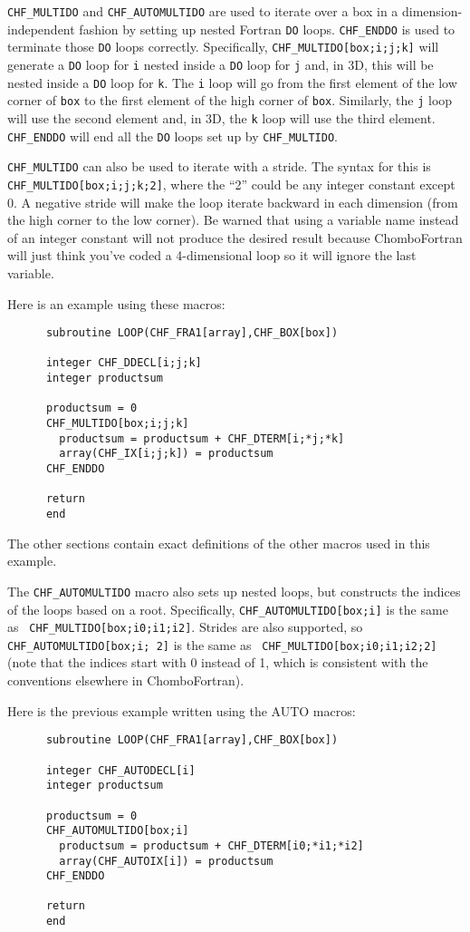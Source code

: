 {\tt CHF\_MULTIDO} and {\tt CHF\_AUTOMULTIDO} are used to iterate over
a box in a dimension-independent  
fashion by setting up nested Fortran {\tt DO} loops. {\tt CHF\_ENDDO}
is used to 
terminate those {\tt DO} loops correctly.  Specifically,
{\tt CHF\_MULTIDO[box;i;j;k]} will generate a {\tt DO} loop for {\tt i}
nested inside a {\tt DO} loop for {\tt j} and, in 3D, this will be nested inside
a {\tt DO} loop for {\tt k}.  The {\tt i} loop will go from the first element of the
low corner of {\tt box} to the first element of the high corner of {\tt box}.
Similarly, the {\tt j} loop will use the second element and, in 3D, the
{\tt k} loop will use the third element.  {\tt CHF\_ENDDO} will end all the
{\tt DO} loops set up by {\tt CHF\_MULTIDO}.

{\tt CHF\_MULTIDO} can also be used to iterate with a stride.  The syntax
for this is {\tt CHF\_MULTIDO[box;i;j;k;2]}, where the ``2'' could be any
integer constant except 0.  A negative stride will make the loop iterate
backward in each dimension (from the high corner to the low corner).
Be warned that using a variable name instead of an integer constant will 
not produce the desired result because ChomboFortran will just think you've
coded a 4-dimensional loop so it will ignore the last variable.

Here is an example using these macros:
\begin{verbatim}
      subroutine LOOP(CHF_FRA1[array],CHF_BOX[box])

      integer CHF_DDECL[i;j;k]
      integer productsum

      productsum = 0
      CHF_MULTIDO[box;i;j;k]
        productsum = productsum + CHF_DTERM[i;*j;*k]
        array(CHF_IX[i;j;k]) = productsum
      CHF_ENDDO

      return
      end
\end{verbatim}
The other sections contain exact definitions of the other macros used in
this example.

The {\tt CHF\_AUTOMULTIDO} macro also sets up nested loops, but
constructs the indices of the loops based on a root. Specifically,
{\tt CHF\_AUTOMULTIDO[box;i]} is the same as {\tt
  CHF\_MULTIDO[box;i0;i1;i2]}. Strides are also supported, so {\tt
  CHF\_AUTOMULTIDO[box;i; 2]} is the same as {\tt
  CHF\_MULTIDO[box;i0;i1;i2;2]} (note that the indices start with 0
instead of 1, which is consistent with the conventions elsewhere in
ChomboFortran). 

Here is the previous example written using the AUTO macros:
\begin{verbatim}
      subroutine LOOP(CHF_FRA1[array],CHF_BOX[box])

      integer CHF_AUTODECL[i]
      integer productsum

      productsum = 0
      CHF_AUTOMULTIDO[box;i]
        productsum = productsum + CHF_DTERM[i0;*i1;*i2]
        array(CHF_AUTOIX[i]) = productsum
      CHF_ENDDO

      return
      end
\end{verbatim}

